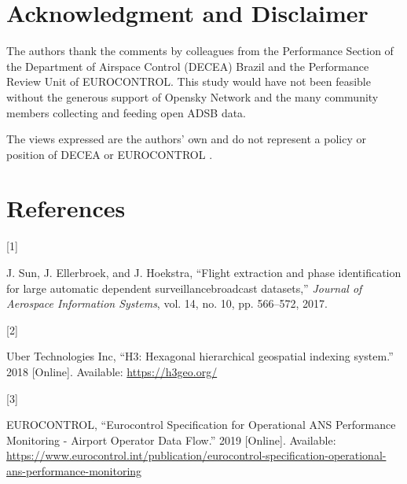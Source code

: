 \documentclass[letterpaper, 10 pt, journal, twoside]{IEEEtran}
\newlength{\cslhangindent}
\newlength{\csllabelwidth}
\newlength{\cslentryspacingunit} %
\newenvironment{CSLReferences}[2] %
 {%
  \setlength{\parindent}{0pt}
  \ifodd #1
  \let\oldpar\par
  \def\par{\hangindent=\cslhangindent\oldpar}
  \fi
  \setlength{\parskip}{#2\cslentryspacingunit}
 }%
 {}
\newcommand{\CSLLeftMargin}[1]{\parbox[t]{\csllabelwidth}{#1}}
\newcommand{\CSLRightInline}[1]{\parbox[t]{\linewidth - \csllabelwidth}{#1}\break}
\begin{document}
\hypertarget{acknowledgment-and-disclaimer}{%
\section*{Acknowledgment and
Disclaimer}\label{acknowledgment-and-disclaimer}}

The authors thank the comments by colleagues from the Performance
Section of the Department of Airspace Control (DECEA) Brazil and the
Performance Review Unit of EUROCONTROL. This study would have not been
feasible without the generous support of Opensky Network and the many
community members collecting and feeding open ADSB data.

The views expressed are the authors' own and do not represent a policy
or position of DECEA or EUROCONTROL .

\hypertarget{bibliography}{%
\section*{References}\label{bibliography}}

\hypertarget{refs}{}
\begin{CSLReferences}{0}{0}
\leavevmode{}%
\CSLLeftMargin{{[}1{]} }%
\CSLRightInline{J. Sun, J. Ellerbroek, and J. Hoekstra, {``Flight
extraction and phase identification for large automatic dependent
surveillance\textendash broadcast datasets,''} \emph{Journal of
Aerospace Information Systems}, vol. 14, no. 10, pp. 566--572, 2017. }

\leavevmode{}%
\CSLLeftMargin{{[}2{]} }%
\CSLRightInline{Uber Technologies Inc, {``H3: Hexagonal hierarchical
geospatial indexing system.''} 2018 {[}Online{]}. Available:
\url{https://h3geo.org/}}

\leavevmode{}%
\CSLLeftMargin{{[}3{]} }%
\CSLRightInline{EUROCONTROL, {``Eurocontrol {Specification} for
{Operational ANS Performance Monitoring} - {Airport Operator Data
Flow}.''} 2019 {[}Online{]}. Available:
\url{https://www.eurocontrol.int/publication/eurocontrol-specification-operational-ans-performance-monitoring}}

\end{CSLReferences}

\end{document}
